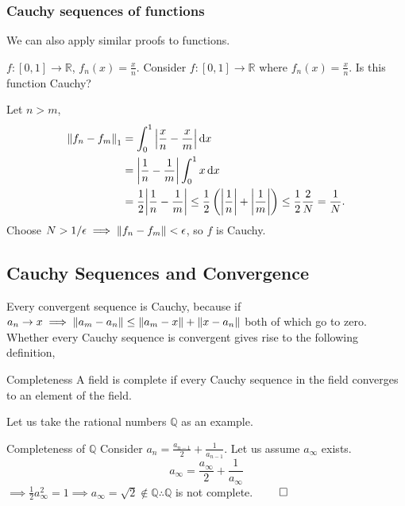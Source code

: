 \documentclass{book}
\begin{document}
\subsubsection{Cauchy sequences of functions}
We can also apply similar proofs to functions.
\begin{Examples}{$f:\left[0,1\right]\to \mathbb{R}$, $f_n(x) = \frac{x}{n}$.}{}
	Consider $f:\left[0,1\right]\to \mathbb{R}$ where $f_n(x) = \frac{x}{n}$. Is this function Cauchy?
\end{Examples}
Let $n > m$,
	\begin{equation}
		\begin{split}
		\norm{f_n - f_m}_1 & = \int_0^1 \abs{\frac{x}{n} - \frac{x}{m}}\dd{x} \\
		& = \abs{\frac{1}{n} - \frac{1}{m}}\int_0^1x \dd{x} \\
		& = \frac{1}{2}\abs{\frac{1}{n} - \frac{1}{m}}\leq \frac{1}{2}\left(\abs{\frac{1}{n}} + \abs{\frac{1}{m}}\right) \leq \frac{1}{2}\frac{2}{N} = \frac{1}{N}.
		\end{split}
	\end{equation}
	Choose $N > 1/\epsilon \implies \norm{f_n - f_m} < \epsilon$, so $f$ is Cauchy.

\subsection{Cauchy Sequences and Convergence}
Every convergent sequence is Cauchy, because if $a_n \to x \implies \norm{a_m - a_n} \leq \norm{a_m - x} + \norm{x - a_n}$ both of which go to zero. Whether every Cauchy sequence is convergent gives rise to the following definition,
\begin{Definitions}{Completeness}{}
	A field is complete if every Cauchy sequence in the field converges to an element of the field.
\end{Definitions}
Let us take the rational numbers $\mathbb{Q}$ as an example.
\begin{Examples}{Completeness of $\mathbb{Q}$}{}
	Consider $a_n = \frac{a_{n-1}}{2} + \frac{1}{a_{n-1}}$. Let us assume $a_{\infty}$ exists.
	\begin{equation}
		a_{\infty} = \frac{a_{\infty}}{2} + \frac{1}{a_{\infty}}
	\end{equation}
	$\implies \frac{1}{2}a_{\infty}^2 = 1 \implies a_{\infty} = \sqrt{2} \notin \mathbb{Q} \therefore \mathbb{Q}$ is not complete. $\qed$ 
\end{Examples}
\end{document}
